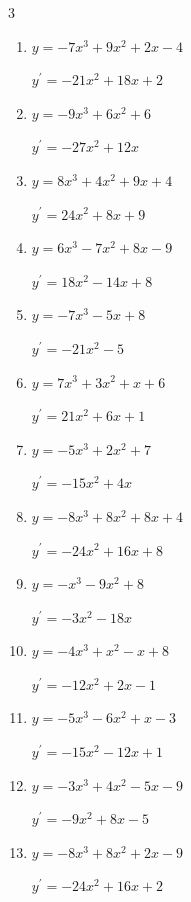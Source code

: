 \begin{multicols}{3}
\begin{enumerate}
  \item $y=-7x^{3}+9x^{2}+2x-4$

        $\displaystyle y^{\prime}=-21x^{2}+18x+2$

  \item $y=-9x^{3}+6x^{2}+6$

        $\displaystyle y^{\prime}=-27x^{2}+12x$

  \item $y=8x^{3}+4x^{2}+9x+4$

        $\displaystyle y^{\prime}=24x^{2}+8x+9$

  \item $y=6x^{3}-7x^{2}+8x-9$

        $\displaystyle y^{\prime}=18x^{2}-14x+8$

  \item $y=-7x^{3}-5x+8$

        $\displaystyle y^{\prime}=-21x^{2}-5$

  \item $y=7x^{3}+3x^{2}+x+6$

        $\displaystyle y^{\prime}=21x^{2}+6x+1$

  \item $y=-5x^{3}+2x^{2}+7$

        $\displaystyle y^{\prime}=-15x^{2}+4x$

  \item $y=-8x^{3}+8x^{2}+8x+4$

        $\displaystyle y^{\prime}=-24x^{2}+16x+8$

  \item $y=-x^{3}-9x^{2}+8$

        $\displaystyle y^{\prime}=-3x^{2}-18x$

  \item $y=-4x^{3}+x^{2}-x+8$

        $\displaystyle y^{\prime}=-12x^{2}+2x-1$

\columnbreak %

  \item $y=-5x^{3}-6x^{2}+x-3$

        $\displaystyle y^{\prime}=-15x^{2}-12x+1$

  \item $y=-3x^{3}+4x^{2}-5x-9$

        $\displaystyle y^{\prime}=-9x^{2}+8x-5$

  \item $y=-8x^{3}+8x^{2}+2x-9$

        $\displaystyle y^{\prime}=-24x^{2}+16x+2$


\end{enumerate}
\end{multicols}
